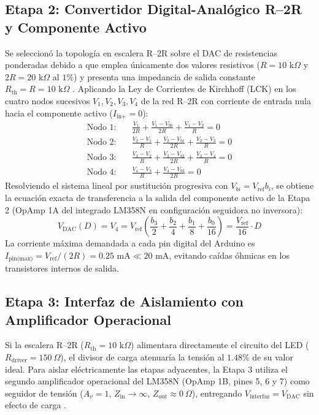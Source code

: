 \documentclass[journal,transmag]{IEEEtran}
\begin{document}
\subsection{Etapa 2: Convertidor Digital-Analógico R--2R y Componente Activo}
Se seleccionó la topología en escalera R--2R sobre el DAC de resistencias ponderadas debido a que emplea únicamente dos valores resistivos ($R = 10\text{ k}\Omega$ y $2R = 20\text{ k}\Omega$ al $1\%$) y presenta una impedancia de salida constante $R_{\text{th}} = R = 10\text{ k}\Omega$ \cite{hayt2012}. Aplicando la Ley de Corrientes de Kirchhoff (LCK) en los cuatro nodos sucesivos $V_1, V_2, V_3, V_4$ de la red R--2R con corriente de entrada nula hacia el componente activo ($I_{\text{in+}} = 0$):
\begin{align}
\text{Nodo 1:}\quad & \frac{V_1}{2R} + \frac{V_1 - V_{b0}}{2R} + \frac{V_1 - V_2}{R} = 0 \\
\text{Nodo 2:}\quad & \frac{V_2 - V_1}{R} + \frac{V_2 - V_{b1}}{2R} + \frac{V_2 - V_3}{R} = 0 \\
\text{Nodo 3:}\quad & \frac{V_3 - V_2}{R} + \frac{V_3 - V_{b2}}{2R} + \frac{V_3 - V_4}{R} = 0 \\
\text{Nodo 4:}\quad & \frac{V_4 - V_3}{R} + \frac{V_4 - V_{b3}}{2R} = 0
\end{align}
Resolviendo el sistema lineal por sustitución progresiva con $V_{bi} = V_{\text{ref}} b_i$, se obtiene la ecuación exacta de transferencia a la salida del componente activo de la Etapa 2 (OpAmp 1A del integrado LM358N en configuración seguidora no inversora):
\begin{equation}
V_{\text{DAC}}(D) = V_4 = V_{\text{ref}}\left(\frac{b_3}{2} + \frac{b_2}{4} + \frac{b_1}{8} + \frac{b_0}{16}\right) = \frac{V_{\text{ref}}}{16}\cdot D
\end{equation}
La corriente máxima demandada a cada pin digital del Arduino es $I_{\text{pin(max)}} = V_{\text{ref}}/(2R) = 0.25\text{ mA} \ll 20\text{ mA}$, evitando caídas óhmicas en los transistores internos de salida.

\subsection{Etapa 3: Interfaz de Aislamiento con Amplificador Operacional}
Si la escalera R--2R ($R_{\text{th}} = 10\text{ k}\Omega$) alimentara directamente el circuito del LED ($R_{\text{driver}} = 150\ \Omega$), el divisor de carga atenuaría la tensión al $1.48\%$ de su valor ideal. Para aislar eléctricamente las etapas adyacentes, la Etapa 3 utiliza el segundo amplificador operacional del LM358N (OpAmp 1B, pines 5, 6 y 7) como seguidor de tensión ($A_v = 1$, $Z_{\text{in}} \to \infty$, $Z_{\text{out}} \approx 0\ \Omega$), entregando $V_{\text{interfaz}} = V_{\text{DAC}}$ sin efecto de carga \cite{alexander2018}.
\end{document}
